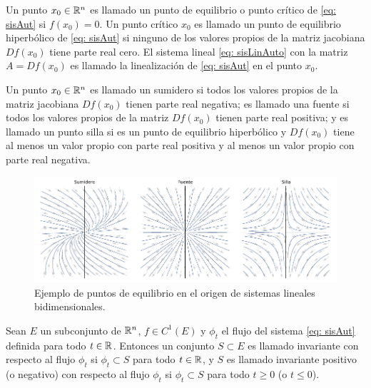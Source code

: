\begin{defi}
	Un punto $x_{0} \in {\mathbb{R}}^{n}$ es llamado un punto de equilibrio o punto crítico de \eqref{eq: sisAut} si $f(x_{0})=0$. Un punto crítico $x_{0}$ es llamado un punto de equilibrio hiperbólico de \eqref{eq: sisAut} si ninguno de los valores propios de la matriz jacobiana $Df(x_{0})$ tiene parte real cero. El sistema lineal \eqref{eq: sisLinAuto} con la matriz $A = Df(x_{0})$ es llamado la linealización de \eqref{eq: sisAut} en el punto $x_{0}$.
\end{defi}

\begin{defi}
	Un punto $x_{0} \in {\mathbb{R}}^{n}$ es llamado un sumidero si todos los valores propios de la matriz jacobiana $Df(x_{0})$ tienen parte real negativa; es llamado una fuente si todos los valores propios de la matriz $Df(x_{0})$ tienen parte real positiva; y es llamado un punto silla si es un punto de equilibrio hiperbólico y $Df(x_{0})$ tiene al menos un valor propio con parte real positiva y al menos un valor propio con parte real negativa.
\end{defi}

\begin{figure}
	\centering
	\includegraphics[width=1\textwidth]{img/EquilibriumPoints.pdf}
	\caption{Ejemplo de puntos de equilibrio en el origen de sistemas lineales bidimensionales.}
	\label{fig: EquilibriumPoints}
\end{figure}

\begin{defi}
	Sean $E$ un subconjunto de ${\mathbb{R}}^{n}$, $f \in C^{1}(E)$ y $\phi_{t}$ el flujo del sistema \eqref{eq: sisAut} definida para todo $t \in {\mathbb{R}}$. Entonces un conjunto $S \subset E$ es llamado invariante con respecto al flujo $\phi_{t}$ si $\phi_{t} \subset S$ para todo $t\in {\mathbb{R}}$, y $S$ es llamado invariante positivo (o negativo) con respecto al flujo $\phi_{t}$ si $\phi_{t} \subset S$ para todo $t \geq 0$ (o $t\leq0$).
\end{defi}

